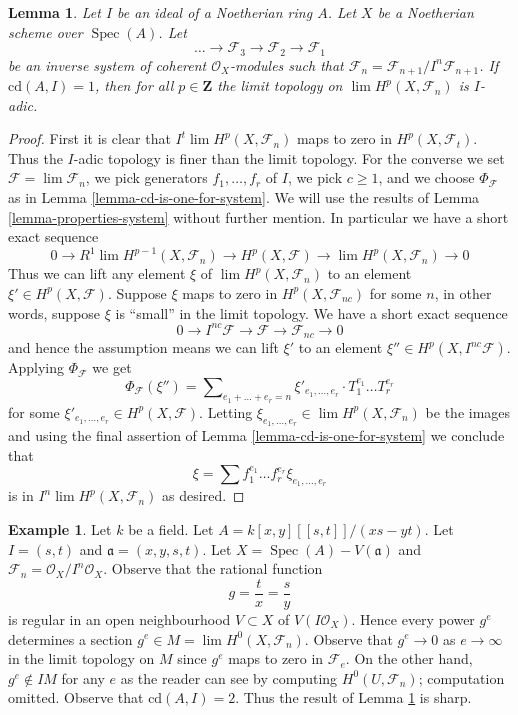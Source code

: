 \documentclass[10pt,a4paper]{amsart}
\theoremstyle{plain}
\newtheorem{lemma}[subsection]{Lemma}
\theoremstyle{definition}
\newtheorem{example}[subsection]{Example}
\theoremstyle{remark}
\numberwithin{equation}{subsection}
\def\lim{\mathop{\mathrm{lim}}\nolimits}
\def\Spec{\mathop{\mathrm{Spec}}}
\begin{document}
\begin{lemma}
\label{lemma-topology-I-adic}
Let $I$ be an ideal of a Noetherian ring $A$. Let $X$ be a Noetherian scheme
over $\Spec(A)$. Let
$$
\ldots \to \mathcal{F}_3 \to \mathcal{F}_2 \to \mathcal{F}_1
$$
be an inverse system of coherent $\mathcal{O}_X$-modules
such that $\mathcal{F}_n = \mathcal{F}_{n + 1}/I^n\mathcal{F}_{n + 1}$.
If $\text{cd}(A, I) = 1$, then for all $p \in \mathbf{Z}$ the limit topology on
$\lim H^p(X, \mathcal{F}_n)$ is $I$-adic.
\end{lemma}

\begin{proof}
First it is clear that $I^t \lim H^p(X, \mathcal{F}_n)$
maps to zero in $H^p(X, \mathcal{F}_t)$. Thus the $I$-adic topology
is finer than the limit topology. For the converse we set
$\mathcal{F} = \lim \mathcal{F}_n$, we pick generators $f_1, \ldots, f_r$
of $I$, we pick $c \geq 1$, and we choose
$\Phi_\mathcal{F}$ as in Lemma \ref{lemma-cd-is-one-for-system}.
We will use the results of Lemma \ref{lemma-properties-system}
without further mention. In particular we have a short exact
sequence
$$
0 \to R^1\lim H^{p - 1}(X, \mathcal{F}_n) \to H^p(X, \mathcal{F})
\to \lim H^p(X, \mathcal{F}_n) \to 0
$$
Thus we can lift any element $\xi$ of $\lim H^p(X, \mathcal{F}_n)$
to an element $\xi' \in H^p(X, \mathcal{F})$. Suppose $\xi$ maps to zero
in $H^p(X, \mathcal{F}_{nc})$ for some $n$, in other
words, suppose $\xi$ is ``small'' in the limit topology. We have a
short exact sequence
$$
0 \to I^{nc}\mathcal{F} \to \mathcal{F} \to \mathcal{F}_{nc} \to 0
$$
and hence the assumption means we can lift $\xi'$ to an element
$\xi'' \in H^p(X, I^{nc}\mathcal{F})$. Applying $\Phi_\mathcal{F}$
we get
$$
\Phi_\mathcal{F}(\xi'') = \sum\nolimits_{e_1 + \ldots + e_r = n}
\xi'_{e_1, \ldots, e_r} \cdot T_1^{e_1} \ldots T_r^{e_r}
$$
for some $\xi'_{e_1, \ldots, e_r} \in H^p(X, \mathcal{F})$.
Letting $\xi_{e_1, \ldots, e_r} \in \lim H^p(X, \mathcal{F}_n)$
be the images and using the final assertion of
Lemma \ref{lemma-cd-is-one-for-system}
we conclude that
$$
\xi = \sum f_1^{e_1} \ldots f_r^{e_r} \xi_{e_1, \ldots, e_r}
$$
is in $I^n \lim H^p(X, \mathcal{F}_n)$ as desired.
\end{proof}

\begin{example}
\label{example-not-I-adic}
Let $k$ be a field. Let $A = k[x, y][[s, t]]/(xs - yt)$.
Let $I = (s, t)$ and $\mathfrak a = (x, y, s, t)$.
Let $X = \Spec(A) - V(\mathfrak a)$ and
$\mathcal{F}_n = \mathcal{O}_X/I^n\mathcal{O}_X$.
Observe that the rational function
$$
g = \frac{t}{x} = \frac{s}{y}
$$
is regular in an open neighbourhood $V \subset X$ of
$V(I\mathcal{O}_X)$. Hence every power $g^e$ determines a section
$g^e \in M = \lim H^0(X, \mathcal{F}_n)$. Observe that
$g^e \to 0$ as $e \to \infty$ in the limit topology on $M$
since $g^e$ maps to zero in $\mathcal{F}_e$.
On the other hand, $g^e \not \in IM$ for any $e$
as the reader can see by computing $H^0(U, \mathcal{F}_n)$;
computation omitted. Observe that $\text{cd}(A, I) = 2$.
Thus the result of Lemma \ref{lemma-topology-I-adic} is sharp.
\end{example}
\end{document}
